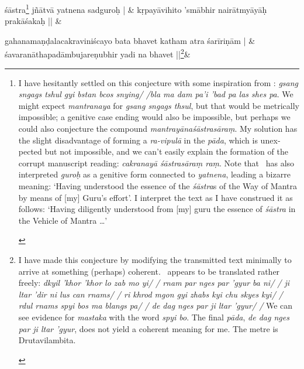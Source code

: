 \documentclass[naipra.tex]{subfiles}
\begin{document}
\begin{sanskrit}
\medskip\versequote
{} śāstra\footnote{\begin{english}
	I have hesitantly settled on this conjecture with some inspiration from \TIB : \emph{gsang sngags tshul gyi bstan bcos snying/ /bla ma dam pa'i 'bad pa las shes pa}.
	We might expect \emph{mantranaya} for \emph{gsang sngags thsul}, but that would be metrically impossible; a genitive case ending would also be impossible, but perhaps we could also conjecture the compound \emph{mantrayānaśāstrasāraṃ}.
	My solution has the slight disadvantage of forming a \emph{ra-vipulā} in the \emph{pāda}, which is unexpected but not impossible, and we can't easily explain the formation of the corrupt manuscript reading: \emph{cakranayā śāstrasāraṃ raṃ}.
	Note that \TIB\ has also interpreted \emph{guroḥ} as a genitive form connected to \emph{yatnena}, leading a bizarre meaning: `Having understood the essence of the \emph{śāstra}s of the Way of Mantra by means of [my] Guru's effort'.
	I interpret the text as I have construed it as follows: `Having diligently understood from [my] guru the essence of \emph{śāstra} in the Vehicle of Mantra \ldots '	
\end{english}} jñātvā yatnena sadguroḥ | &
kṛpayāvihito 'smābhir nairātmyāyāḥ prakāśakaḥ || \&



\medskip\versequote
gahanamaṇḍalacakraviniścayo bata bhavet katham atra śarīriṇām | &
śavaranāthapadāmbujareṇubhir yadi na  bhavet ||\footnote{\begin{english}
	I have made this conjecture by modifying the transmitted text minimally to arrive at something (perhaps) coherent.
	\TIB\ appears to be translated rather freely: \emph{%
		dkyil 'khor 'khor lo zab mo yi/ /
	 	rnam par nges par 'gyur ba ni/ /
		ji ltar 'dir ni lus can rnams/ /
		ri khrod mgon gyi zhabs kyi chu skyes kyi/ /
		rdul rnams spyi bos ma blangs pa/ /
		de dag nges par ji ltar 'gyur/ /%
	} We can see evidence for \emph{mastaka} with the word \emph{spyi bo}.
	The final \emph{pāda}, \emph{de dag nges par ji ltar 'gyur}, does not yield a coherent meaning for me.
	The metre is Drutavilambita.
\end{english}}\&


\end{sanskrit}
\end{document}
